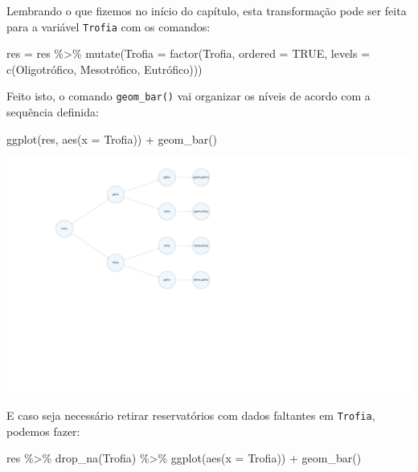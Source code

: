 \documentclass[
]{book}
\newenvironment{Shaded}{\begin{snugshade}}{\end{snugshade}}
\newcommand{\AttributeTok}[1]{\textcolor[rgb]{0.77,0.63,0.00}{#1}}
\newcommand{\ConstantTok}[1]{\textcolor[rgb]{0.00,0.00,0.00}{#1}}
\newcommand{\FunctionTok}[1]{\textcolor[rgb]{0.00,0.00,0.00}{#1}}
\newcommand{\NormalTok}[1]{#1}
\newcommand{\OtherTok}[1]{\textcolor[rgb]{0.56,0.35,0.01}{#1}}
\newcommand{\SpecialCharTok}[1]{\textcolor[rgb]{0.00,0.00,0.00}{#1}}
\newcommand{\StringTok}[1]{\textcolor[rgb]{0.31,0.60,0.02}{#1}}
\begin{document}
Lembrando o que fizemos no início do capítulo, esta transformação pode ser feita para a variável \texttt{Trofia} com os comandos:

\begin{Shaded}
\begin{Highlighting}[]
\NormalTok{res }\OtherTok{=}\NormalTok{ res }\SpecialCharTok{\%\textgreater{}\%} 
  \FunctionTok{mutate}\NormalTok{(}\AttributeTok{Trofia =} \FunctionTok{factor}\NormalTok{(Trofia, }\AttributeTok{ordered =} \ConstantTok{TRUE}\NormalTok{, }
                         \AttributeTok{levels =} \FunctionTok{c}\NormalTok{(}\StringTok{\textquotesingle{}Oligotrófico\textquotesingle{}}\NormalTok{, }\StringTok{\textquotesingle{}Mesotrófico\textquotesingle{}}\NormalTok{, }\StringTok{\textquotesingle{}Eutrófico\textquotesingle{}}\NormalTok{)))}
\end{Highlighting}
\end{Shaded}

Feito isto, o comando \texttt{geom\_bar()} vai organizar os níveis de acordo com a sequência definida:

\begin{Shaded}
\begin{Highlighting}[]
\FunctionTok{ggplot}\NormalTok{(res, }\FunctionTok{aes}\NormalTok{(}\AttributeTok{x =}\NormalTok{ Trofia)) }\SpecialCharTok{+}
  \FunctionTok{geom\_bar}\NormalTok{()}
\end{Highlighting}
\end{Shaded}

\includegraphics{probest-cambientais_files/figure-latex/unnamed-chunk-85-1.pdf}

E caso seja necessário retirar reservatórios com dados faltantes em \texttt{Trofia}, podemos fazer:

\begin{Shaded}
\begin{Highlighting}[]
\NormalTok{res }\SpecialCharTok{\%\textgreater{}\%} 
  \FunctionTok{drop\_na}\NormalTok{(Trofia) }\SpecialCharTok{\%\textgreater{}\%} 
\FunctionTok{ggplot}\NormalTok{(}\FunctionTok{aes}\NormalTok{(}\AttributeTok{x =}\NormalTok{ Trofia)) }\SpecialCharTok{+}
  \FunctionTok{geom\_bar}\NormalTok{()}
\end{Highlighting}
\end{Shaded}
\end{document}
